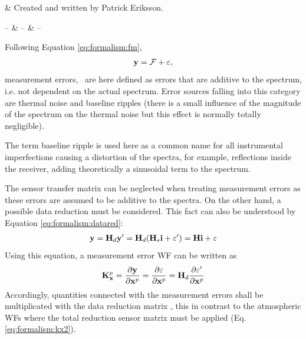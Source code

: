 %
%
 \label{sec:measerr}


%
%
 & Created and written by Patrick Eriksson.\\
\stophistory


%
%
%
\startsymbols
  -- & -- & -- \\
 \label{symtable:measerr}     
\stopsymbols



%
%
Following Equation \ref{eq:formalism:fm},
\begin{eqnarray}
   \mathbf{y} = \mathcal{F} + \varepsilon, \nonumber
\end{eqnarray}
measurement errors, \merr\, are here defined as errors that are
additive to the spectrum, i.e. not dependent on the actual spectrum.
Error sources falling into this category are thermal noise and
baseline ripples (there is a small influence of the magnitude of the
spectrum on the thermal noise but this effect is normally totally
negligible).

The term baseline ripple is used here as a common name for all instrumental
imperfections causing a distortion of the spectra, for example,
reflections inside the receiver, adding theoretically a sinusoidal term
to the spectrum.



 \label{sec:measerr:general}
 
 The sensor transfer matrix can be neglected when treating measurement
 errors as these errors are assumed to be additive to the spectra. On
 the other hand, a possible data reduction must be considered. This
 fact can also be understood by Equation \ref{eq:formalism:datared}:
 \begin{eqnarray}
   \mathbf{y} = \mathbf{H}_d \mathbf{y}' = \mathbf{H}_d (\mathbf{H}_s \mathbf{i} + \varepsilon') = \mathbf{H} \mathbf{i} + \varepsilon \nonumber
 \end{eqnarray}
 Using this equation, a measurement error WF can be
 written as
 \begin{equation}
    \mathbf{K}_{\mathbf{x}}^p = \frac{\partial \mathbf{y}}{\partial \mathbf{x}^p} 
               = \frac{\partial \varepsilon}{\partial \mathbf{x}^p}
               =  \mathbf{H}_d \frac{\partial \varepsilon'}{\partial \mathbf{x}^p}
  \label{eq:measerr:kx}
 \end{equation}
 Accordingly, quantities connected with the measurement errors shall be
 multiplicated with the data reduction matrix \Hd, this in contrast to
 the atmospheric WFs where the total reduction sensor matrix must be applied
 (Eq. \ref{eq:formalism:kx2}).



